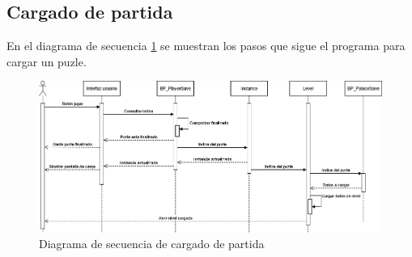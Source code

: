 \subsection{Cargado de partida}
En el diagrama de secuencia \ref{fig:diagrama_secuencia_cargado} se muestran los pasos que sigue el programa para cargar un puzle.

\begin{figure}[H]
    \centering
    \includegraphics[scale=0.40]{../img/anexos/diagrama_secuencia_carga.png}
    \caption[Diagrama de secuencia cargado de partida]{Diagrama de secuencia de cargado de partida}
    \label{fig:diagrama_secuencia_cargado}
\end{figure}
